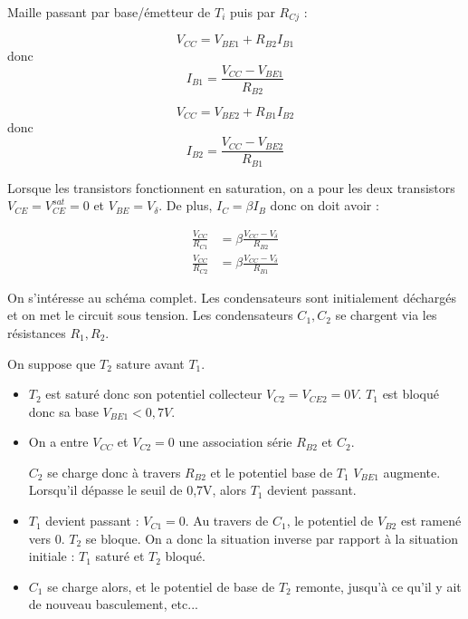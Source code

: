 \documentclass[../../Cours_M1.tex]{subfiles}
\begin{document}
Maille passant par base/émetteur de $T_i$ puis par $R_{Cj}$ :
\begin{multicols}{2}
\[V_{CC} = V_{BE1} + R_{B2}I_{B1} \]
donc
\[I_{B1} = \frac{V_{CC}-V_{BE1}}{R_{B2}}\]

\[V_{CC} = V_{BE2} + R_{B1}I_{B2} \]
donc
\[I_{B2} = \frac{V_{CC}-V_{BE2}}{R_{B1}}\]
\end{multicols}

Lorsque les transistors fonctionnent en saturation, on a pour les deux transistors $V_{CE} = V_{CE}^{sat} = 0$ et $V_{BE} = V_{\delta}$. De plus, $I_C = \beta I_B$ donc on doit avoir :

\begin{align*}
\frac{V_{CC}}{R_{C1}} & = \beta \frac{V_{CC}-V_{\delta}}{R_{B2}} \\
\frac{V_{CC}}{R_{C2}} & = \beta \frac{V_{CC}-V_{\delta}}{R_{B1}}
\end{align*}

\noindent On s'intéresse au schéma complet. Les condensateurs sont initialement déchargés et on met le circuit sous tension. Les condensateurs $C_1,C_2$ se chargent via les résistances $R_1,R_2$.

On suppose que $T_2$ sature avant $T_1$.

\begin{itemize}
%
%

\item $T_2$ est saturé donc son potentiel collecteur $V_{C2} = V_{CE2} = 0V$. $T_1$ est bloqué donc sa base $V_{BE1} < 0,7V$.

\item On a entre $V_{CC}$ et $V_{C2}=0$ une association série $R_{B2}$ et $C_2$.

$C_2$ se charge donc à travers $R_{B2}$ et le potentiel base de $T_1$ $V_{BE1}$ augmente. Lorsqu'il dépasse le seuil de 0,7V, alors $T_1$ devient passant.

\item $T_1$ devient passant : $V_{C1}=0$. Au travers de $C_1$, le potentiel de $V_{B2}$ est ramené vers 0. $T_2$ se bloque. On a donc la situation inverse par rapport à la situation initiale : $T_1$ saturé et $T_2$ bloqué.

\item $C_1$ se charge alors, et le potentiel de base de $T_2$ remonte, jusqu'à ce qu'il y ait de nouveau basculement, etc...

\end{itemize}
\end{document}
